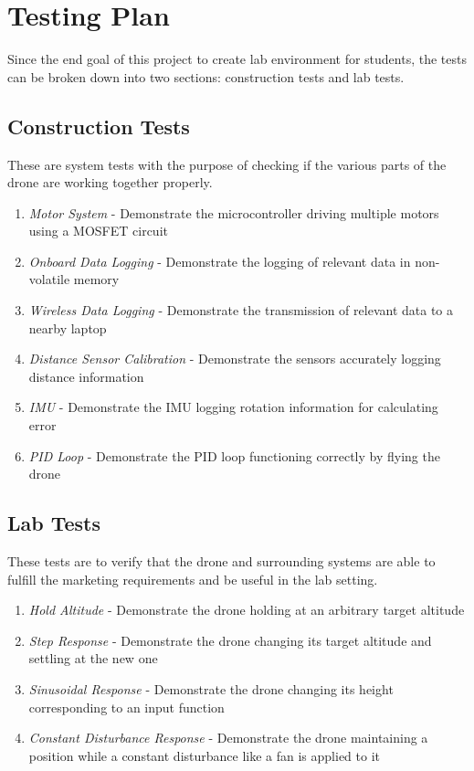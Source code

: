 \documentclass[12pt, titlepage]{article}
\begin{document}
\section{Testing Plan}
Since the end goal of this project to create lab environment for students, the tests can be broken down into two sections: construction tests and lab tests.

\subsection{Construction Tests}
These are system tests with the purpose of checking if the various parts of the drone are working together properly.

\begin{enumerate}
	\item \textit{Motor System} - Demonstrate the microcontroller driving multiple motors using a MOSFET circuit
	\item \textit{Onboard Data Logging} - Demonstrate the logging of relevant data in non-volatile memory 
	\item \textit{Wireless Data Logging} - Demonstrate the transmission of relevant data to a nearby laptop
	\item \textit{Distance Sensor Calibration} - Demonstrate the sensors accurately logging distance information
	\item \textit{IMU} - Demonstrate the IMU logging rotation information for calculating error
	\item \textit{PID Loop} - Demonstrate the PID loop functioning correctly by flying the drone
\end{enumerate}

\subsection{Lab Tests}
These tests are to verify that the drone and surrounding systems are able to fulfill the marketing requirements and be useful in the lab setting.

\begin{enumerate}
	\item \textit{Hold Altitude} - Demonstrate the drone holding at an arbitrary target altitude
	\item \textit{Step Response} - Demonstrate the drone changing its target altitude and settling at the new one
	\item \textit{Sinusoidal Response} - Demonstrate the drone changing its height corresponding to an input function
	\item \textit{Constant Disturbance Response} - Demonstrate the drone maintaining a position while a constant disturbance like a fan is applied to it
\end{enumerate}
\end{document}
